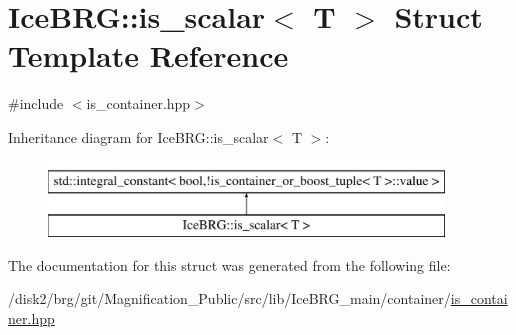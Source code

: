 \hypertarget{structIceBRG_1_1is__scalar}{}\section{Ice\+B\+R\+G\+:\+:is\+\_\+scalar$<$ T $>$ Struct Template Reference}
\label{structIceBRG_1_1is__scalar}


{\ttfamily \#include $<$is\+\_\+container.\+hpp$>$}

Inheritance diagram for Ice\+B\+R\+G\+:\+:is\+\_\+scalar$<$ T $>$\+:\begin{figure}[H]
\begin{center}
\leavevmode
\includegraphics[height=2.000000cm]{structIceBRG_1_1is__scalar}
\end{center}
\end{figure}


The documentation for this struct was generated from the following file\+:\begin{DoxyCompactItemize}
\item 
/disk2/brg/git/\+Magnification\+\_\+\+Public/src/lib/\+Ice\+B\+R\+G\+\_\+main/container/\hyperlink{is__container_8hpp}{is\+\_\+container.\+hpp}\end{DoxyCompactItemize}
